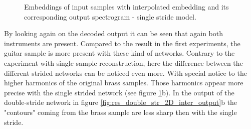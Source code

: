 \begin{figure}[htb!]
    \centering
    \captionsetup{justification=centering}
    \caption{Embeddings of input samples with interpolated embedding and its corresponding output spectrogram - single stride model.}
    \label{fig:res_single_str_2D_inter_output}
\end{figure}

By looking again on the decoded output it can be seen that again both instruments are present. Compared to the result in the first experiments, the guitar sample is more present with these kind of networks. Contrary to the experiment with single sample reconstruction, here the difference between the different strided networks can be noticed even more. With special notice to the higher harmonics of the original brass samples. Those harmonics appear more precise with the single strided network (see figure \ref{fig:res_single_str_2D_inter_output}b). In the output of the double-stride network in figure \ref{fig:res_double_str_2D_inter_output}b the "contours" coming from the brass sample are less sharp then with the single stride.

